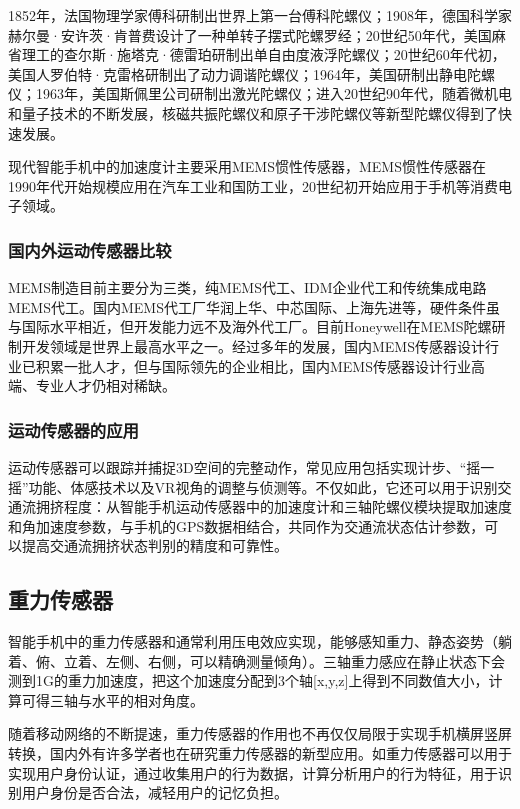 \documentclass[a4paper,11pt,onecolumn,twoside]{article}
\begin{document}
\begin{multicols}{2}
1852年，法国物理学家傅科研制出世界上第一台傅科陀螺仪；1908年，德国科学家赫尔曼·安许茨·肯普费设计了一种单转子摆式陀螺罗经；20世纪50年代，美国麻省理工的查尔斯·施塔克·德雷珀研制出单自由度液浮陀螺仪；20世纪60年代初，美国人罗伯特·克雷格研制出了动力调谐陀螺仪；1964年，美国研制出静电陀螺仪；1963年，美国斯佩里公司研制出激光陀螺仪；进入20世纪90年代，随着微机电和量子技术的不断发展，核磁共振陀螺仪和原子干涉陀螺仪等新型陀螺仪得到了快速发展。

现代智能手机中的加速度计主要采用MEMS惯性传感器，MEMS惯性传感器在1990年代开始规模应用在汽车工业和国防工业，20世纪初开始应用于手机等消费电子领域。

\subsubsection{国内外运动传感器比较}

MEMS制造目前主要分为三类，纯MEMS代工、IDM企业代工和传统集成电路MEMS代工。国内MEMS代工厂华润上华、中芯国际、上海先进等，硬件条件虽与国际水平相近，但开发能力远不及海外代工厂。目前Honeywell在MEMS陀螺研制开发领域是世界上最高水平之一。经过多年的发展，国内MEMS传感器设计行业已积累一批人才，但与国际领先的企业相比，国内MEMS传感器设计行业高端、专业人才仍相对稀缺。

\subsubsection{运动传感器的应用}

运动传感器可以跟踪并捕捉3D空间的完整动作，常见应用包括实现计步、“摇一摇”功能、体感技术以及VR视角的调整与侦测等。不仅如此，它还可以用于识别交通流拥挤程度：从智能手机运动传感器中的加速度计和三轴陀螺仪模块提取加速度和角加速度参数，与手机的GPS数据相结合，共同作为交通流状态估计参数，可以提高交通流拥挤状态判别的精度和可靠性。\cite{DetectTrafiic}

\subsection{重力传感器}

智能手机中的重力传感器和通常利用压电效应实现，能够感知重力、静态姿势（躺着、俯、立着、左侧、右侧，可以精确测量倾角）。三轴重力感应在静止状态下会测到1G的重力加速度，把这个加速度分配到3个轴[x,y,z]上得到不同数值大小，计算可得三轴与水平的相对角度。\cite{GSensorTraditionnalUsage}

随着移动网络的不断提速，重力传感器的作用也不再仅仅局限于实现手机横屏竖屏转换，国内外有许多学者也在研究重力传感器的新型应用。如重力传感器可以用于实现用户身份认证，通过收集用户的行为数据，计算分析用户的行为特征，用于识别用户身份是否合法，减轻用户的记忆负担。\cite{GSensorUsage}


\end{multicols}
\end{document}
